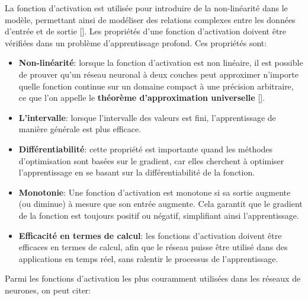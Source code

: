 La fonction d'activation est utilisée pour introduire de la non-linéarité dans
le modèle, permettant ainsi de modéliser des relations complexes entre les
données d'entrée et de sortie [\cite{Goodfellow-et-al-2016}]. Les propriétés
d’une fonction d’activation doivent être vérifiées dans un problème
d'apprentissage profond. Ces propriétés sont:
\begin{itemize}
	\item \textbf{Non-linéarité}: lorsque la fonction d’activation est non linéaire, il est possible de prouver qu’un réseau neuronal à deux couches peut approximer n'importe quelle fonction continue sur un domaine compact à une précision arbitraire, ce que l’on appelle le \textbf{théorème d’approximation universelle} [\cite{Goodfellow-et-al-2016}].
	\item \textbf{L’intervalle}: lorsque l’intervalle des valeurs est fini, l'apprentissage de manière générale est plus efficace.
	\item \textbf{Différentiabilité}: cette propriété est importante quand les méthodes d’optimisation sont basées sur le gradient, car elles cherchent à optimiser l’apprentissage en se basant sur la  différentiabilité de la fonction.
	\item \textbf{Monotonie}: Une fonction d'activation est monotone si sa sortie augmente (ou diminue) à mesure que son entrée augmente. Cela garantit que le gradient de la fonction est toujours positif ou négatif, simplifiant ainsi l’apprentissage.
	\item \textbf{Efficacité en termes de calcul}: les fonctions d'activation doivent être efficaces en termes de calcul, afin que le réseau puisse être utilisé dans des applications en temps réel, sans ralentir le processus de l’apprentissage.
\end{itemize}
\medskip
Parmi les fonctions d'activation les plus couramment utilisées dans les réseaux de neurones, on peut citer:

